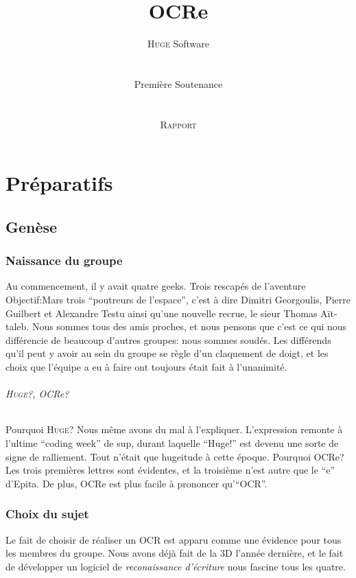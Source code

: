 \documentclass[]{report}
\title{OCRe}
\author{ \textsc{Huge} Software \\
\\
\\
Premi\`ere Soutenance \\
\\
\\
\textsc{Rapport}}
\date{}
\begin{document}
\ifpdf {} \else {} \fi

\maketitle

\pagebreak

\tableofcontents
\pagebreak

\part{Pr\'eparatifs}

\label{prt:preparatifs}

\chapter{Gen\`ese} %
\label{cha:genese}
	\section{Naissance du groupe} %
	\label{sec:naissance_du_groupe}
		Au commencement, il y avait quatre geeks. Trois rescap\'es de l'aventure Objectif:Mars trois ``poutreurs de l'espace'', c'est \`a dire Dimitri Georgoulis, Pierre Guilbert et Alexandre Testu ainsi qu'une nouvelle recrue, le sieur Thomas A\"it-taleb. Nous sommes tous des amis proches, et nous pensons que c'est ce qui nous diff\'erencie de beaucoup d'autres groupes: nous sommes soud\'es. Les diff\'erends qu'il peut y avoir au sein du groupe se r\`egle d'un claquement de doigt, et les choix que l'\'equipe a eu \`a faire ont toujours \'etait fait \`a l'unanimit\'e.
		\paragraph{\textsc{Huge}?, OCRe?} %
		\label{par:huge_ocre_}
			Pourquoi \textsc{Huge}? Nous m\^eme avons du mal \`a l'expliquer. L'expression remonte \`a l'ultime ``coding week'' de sup, durant laquelle ``Huge!'' est devenu une sorte de signe de ralliement. Tout n'\'etait que hugeitude \`a cette \'epoque.
			Pourquoi OCRe? Les trois premi\`eres lettres sont \'evidentes, et la troisi\`eme n'est autre que le ``e'' d'Epita. De plus, OCRe est plus facile \`a prononcer qu'``OCR''.

	\section{Choix du sujet} %
	\label{sec:choix_du_sujet}
		Le fait de choisir de r\'ealiser un OCR est apparu comme une \'evidence pour tous les membres du groupe. Nous avons d\'ej\`a fait de la 3D l'ann\'ee derni\`ere, et le fait de d\'evelopper un logiciel de \emph{reconaissance d'\'ecriture} nous fascine tous les quatre.
\end{document}
